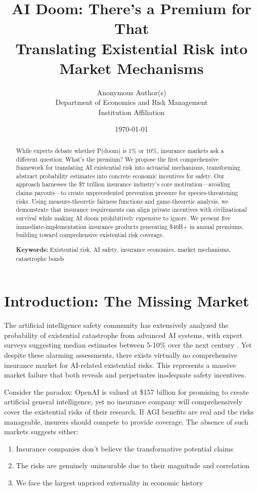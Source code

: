 \documentclass[11pt]{article}
\title{AI Doom: There's a Premium for That\\
\large Translating Existential Risk into Market Mechanisms}
\author{Anonymous Author(s)\\
\small Department of Economics and Risk Management\\
\small Institution Affiliation}
\date{\today}
\begin{document}
\maketitle

\begin{abstract}
While experts debate whether P(doom) is 1\% or 10\%, insurance markets ask a different question: What's the premium? We propose the first comprehensive framework for translating AI existential risk into actuarial mechanisms, transforming abstract probability estimates into concrete economic incentives for safety. Our approach harnesses the \$7 trillion insurance industry's core motivation---avoiding claims payouts---to create unprecedented prevention pressure for species-threatening risks. Using measure-theoretic fairness functions and game-theoretic analysis, we demonstrate that insurance requirements can align private incentives with civilizational survival while making AI doom prohibitively expensive to ignore. We present five immediate-implementation insurance products generating \$40B+ in annual premiums, building toward comprehensive existential risk coverage.

\textbf{Keywords:} Existential risk, AI safety, insurance economics, market mechanisms, catastrophe bonds
\end{abstract}

\section{Introduction: The Missing Market}

The artificial intelligence safety community has extensively analyzed the probability of existential catastrophe from advanced AI systems, with expert surveys suggesting median estimates between 5-10\% over the next century \citep{grace2018ai}. Yet despite these alarming assessments, there exists virtually no comprehensive insurance market for AI-related existential risks. This represents a massive market failure that both reveals and perpetuates inadequate safety incentives.

Consider the paradox: OpenAI is valued at \$157 billion for promising to create artificial general intelligence, yet no insurance company will comprehensively cover the existential risks of their research. If AGI benefits are real and the risks manageable, insurers should compete to provide coverage. The absence of such markets suggests either:

\begin{enumerate}
   \item Insurance companies don't believe the transformative potential claims
   \item The risks are genuinely uninsurable due to their magnitude and correlation
   \item We face the largest unpriced externality in economic history
\end{enumerate}
\end{document}
